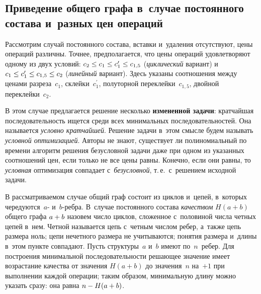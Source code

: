 \begin{multicols}{2}
  \subsection{Приведение общего графа в~случае постоянного состава 
и~разных цен операций}

\vspace*{-2pt}
  
   Рассмотрим случай постоянного состава, вставки и~удаления отсутствуют, 
цены операций различны. Точнее, предполагается, что цены операций 
удовлетворяют одному из двух условий: $c_2\hm\leq c_1\hm\leq 
c_1^\prime\hm\leq c_{1{,}5}$ (\textit{циклический} вариант) и~$c_1\hm\leq 
c_1^\prime\hm\leq c_{1{,}5}\hm\leq c_2$ (\textit{линейный} вариант). Здесь 
указаны \mbox{соотношения} между ценами разреза~$c_1$, склейки~$c_1^\prime$, 
полуторной переклейки~$c_{1{,}5}$, двойной переклейки~$c_2$. 
  
  В этом случае предлагается решение несколько \textbf{измененной задачи}: 
кратчайшая последовательность ищется среди всех минимальных 
последовательностей. Она называется \textit{условно кратчайшей}. Решение 
задачи в~этом смысле будем называть \textit{условной оптимизацией}. Авторы 
не знают, существует ли полиномиальный по времени алгоритм решения 
безусловной задачи даже при одном из указанных соотношений цен, если 
только не все цены равны. Конечно, если они равны, то \textit{условная} 
оптимизация совпадает с~\textit{безусловной}, т.\,е.\ с~решением исходной 
задачи. 
  
  В рассматриваемом случае общий граф состоит из циклов и~цепей, в~которых 
чередуются~$a$- и~$b$-реб\-ра. В~случае постоянного состава 
\textit{качеством} $H(a+b)$ общего графа $a\hm+b$ назовем число циклов, 
сложенное с~половиной числа четных цепей в~нем. Четной называется цепь 
с~четным числом ребер, а~так\-же цепь размера ноль; цепи нечетного размера не 
учитываются; понятия размера и~длины в~этом пункте совпадают. Пусть 
структуры~$a$ и~$b$ имеют по~$n$~ребер. Для построения минимальной 
последовательности решающее значение имеет возрастание качества от 
значения $H(a+b)$ до значения~$n$ на~$+1$ при выполнении каждой 
операции; таким образом, минимальную длину можно указать сразу: она равна 
$n\hm- H(a\hm+b)$. 
  
  \smallskip
    

\end{multicols}
